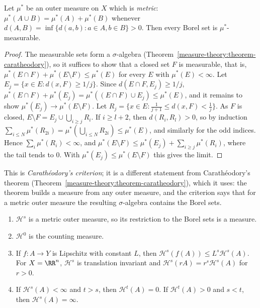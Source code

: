 \begin{lemma}\label{geometric-measure-theory:lemma-metric-outer-measure}
Let $\mu^*$ be an outer measure on $X$ which is \emph{metric}: $\mu^*(A \cup B) = \mu^*(A) + \mu^*(B)$ whenever $d(A, B) = \inf\{d(a, b) : a \in A, b \in B\} > 0$. Then every Borel set is
$\mu^*$-measurable.
\end{lemma}

\begin{proof}
The measurable sets form a $\sigma$-algebra (Theorem~\ref{measure-theory:theorem-caratheodory}), so it suffices to show that a closed set $F$ is measurable, that is,
$\mu^*(E \cap F) + \mu^*(E \setminus F) \leq \mu^*(E)$ for every $E$ with $\mu^*(E) < \infty$. Let $E_j = \{x \in E : d(x, F) \geq 1/j\}$. Since $d(E \cap F, E_j) \geq 1/j$,
$\mu^*(E \cap F) + \mu^*(E_j) = \mu^*((E \cap F) \cup E_j) \leq \mu^*(E)$, and it remains to show $\mu^*(E_j) \to \mu^*(E \setminus F)$. Let
$R_j = \{x \in E : \frac1{j+1} \leq d(x, F) < \frac1j\}$. As $F$ is closed, $E \setminus F = E_j \cup \bigcup_{i \geq j}R_i$. If $i \geq l + 2$, then $d(R_i, R_l) > 0$, so by induction
$\sum_{i \leq N}\mu^*(R_{2i}) = \mu^*(\bigcup_{i \leq N}R_{2i}) \leq \mu^*(E)$, and similarly for the odd indices. Hence $\sum_i\mu^*(R_i) < \infty$, and
$\mu^*(E \setminus F) \leq \mu^*(E_j) + \sum_{i \geq j}\mu^*(R_i)$, where the tail tends to $0$. With $\mu^*(E_j) \leq \mu^*(E \setminus F)$ this gives the limit.
\end{proof}

This is \emph{Carath\'eodory's criterion}; it is a different statement from Carath\'eodory's theorem (Theorem~\ref{measure-theory:theorem-caratheodory}), which it uses: the theorem builds a measure
from any outer measure, and the criterion says that for a metric outer measure the resulting $\sigma$-algebra contains the Borel sets.

\begin{proposition}\label{geometric-measure-theory:proposition-hausdorff}
\begin{enumerate}
\item $\mathcal{H}^s$ is a metric outer measure, so its restriction to the Borel sets is a measure.
\item $\mathcal{H}^0$ is the counting measure.
\item If $f \colon A \to Y$ is Lipschitz with constant $L$, then $\mathcal{H}^s(f(A)) \leq L^s\mathcal{H}^s(A)$. For $X = \RR^n$, $\mathcal{H}^s$ is translation invariant and
$\mathcal{H}^s(rA) = r^s\mathcal{H}^s(A)$ for $r > 0$.
\item If $\mathcal{H}^s(A) < \infty$ and $t > s$, then $\mathcal{H}^t(A) = 0$. If $\mathcal{H}^t(A) > 0$ and $s < t$, then $\mathcal{H}^s(A) = \infty$.
\end{enumerate}
\end{proposition}

